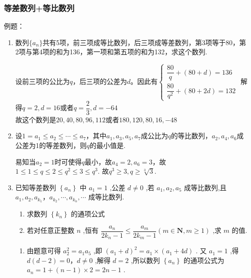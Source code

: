 \subsubsection*{等差数列+等比数列}
例题：
\begin{enumerate}
    \item 数列$\{a_n\}$共有5项，前三项成等比数列，后三项成等差数列，第3项等于80，第2项与第4项的和为136，第一项和第五项的和为132，求这个数列.
    \begin{jieda}
        设前三项的公比为$q$，后三项的公差为$d$。因此有$\left \{
        \begin{array}{l}
            \dfrac{80}{q} + (80 + d) = 136   \\
            \dfrac{80}{q^2} + (80 + 2d) = 132  
        \end{array}\right.$
        解得$q = 2, d = 16$或者$q = \dfrac{2}{3}, d = -64$ \\
        故这个数列是$20, 40, 80, 96, 112$或者$180, 120, 80, 16, -48$
    \end{jieda}
    
    \item 设$1 = a_1 \leq a_2 \leq \cdots \leq a_7$，其中$a_1, a_3, a_5, a_7$成公比为$q$的等比数列，$a_2, a_4, a_6$成公差为1的等差数列，则$q$的最小值是.
    \begin{jieda}
        易知当$a_2 = 1$时可使得$q$最小，故$a_4 = 2, a_6 = 3$，故$1 \leq 1 \leq q \leq 2 \leq q^2 \leq 3 \leq q^3$. 故$q^3 \geq 3, q\geq \sqrt[3]{3}$.
    \end{jieda}
    
    \item 已知等差数列 $\left\{{a}_{n}\right\}$ 中 ${a}_{1} = 1$ ,公差 $d \neq  0$ ,若 ${a}_{1},{a}_{2},{a}_{5}$ 成等比数列,且 ${a}_{1},{a}_{2},{a}_{{k}_{1}}$，${a}_{{k}_{2}},\cdots ,{a}_{{k}_{n}},\cdots$ 成等比数列.
    \begin{enumerate}
        \item 求数列 $\left\{  {k}_{n}\right\}$ 的通项公式
        \item 若对任意正整数 $n$ ,恒有 $\dfrac{{a}_{n}}{2{k}_{n} - 1} \leq  \dfrac{{a}_{m}}{2{k}_{m} - 1}\left( {m \in  \mathbf{N},m \geq  1}\right)$ ,求 $m$ 的值.
    \end{enumerate}
    \begin{jieda}
        \begin{enumerate}
            \item 由题意可得 ${a}_{2}^{2} = {a}_{1}{a}_{5}$ ,即 ${\left( {a}_{1} + d\right) }^{2} = {a}_{1} \times  \left( {{a}_{1} + {4d}}\right)$ . 又 ${a}_{1} = 1$ ,得 $d\left( {d - 2}\right)  = 0$，$d \neq  0$ ,解得 $d = 2$ ,所以数列 $\left\{  {a}_{n}\right\}$ 的通项公式为 ${a}_{n} = 1 + \left( {n - 1}\right)  \times  2 = {2n} - 1$ .
            

\end{enumerate}
\end{jieda}
\end{enumerate}
